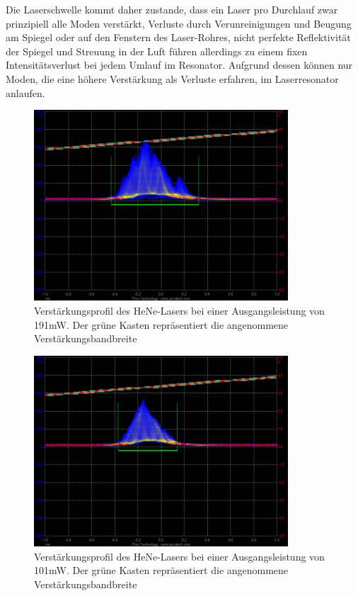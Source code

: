 \documentclass[bigchapter,colorback,accentcolor=tud4b,linedtoc,11pt]{tudreport}
\numberwithin{equation}{subsection}
\begin{document}
Die Laserschwelle kommt daher zustande, dass ein Laser pro Durchlauf zwar prinzipiell alle Moden verstärkt, Verluste durch Verunreinigungen und Beugung am Spiegel oder auf den Fenstern des Laser-Rohres, nicht perfekte Reflektivität der Spiegel und Streuung in der Luft führen allerdings zu einem fixen Intensitätsverlust bei jedem Umlauf im Resonator. Aufgrund dessen können nur Moden, die eine höhere Verstärkung als Verluste erfahren, im Laserresonator anlaufen.

\begin{figure}[h!]
  \centering
    \includegraphics[width=95mm]{img/Bandbreite81cm191mW4uW.png}
  \caption{Verstärkungsprofil des HeNe-Lasers bei einer Ausgangsleistung von 191mW. Der grüne Kasten repräsentiert die angenommene Verstärkungsbandbreite}
\end{figure}
\begin{figure}[h!]
  \centering
    \includegraphics[width=95mm]{img/Bandbreite81cm101mW4uW.png}
  \caption{Verstärkungsprofil des HeNe-Lasers bei einer Ausgangsleistung von 101mW. Der grüne Kasten repräsentiert die angenommene Verstärkungsbandbreite}
\end{figure}
\FloatBarrier
\end{document}
